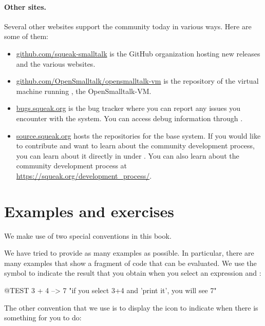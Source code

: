 \documentclass[a4paper,10pt,twoside]{book}
\begin{document}
\paragraph{Other sites.} Several other websites support the \sq community today in various ways.
Here are some of them:
\begin{itemize}
  \item \url{github.com/squeak-smalltalk} is the GitHub organization hosting new releases and the various \sq websites.

  \item \url{github.com/OpenSmalltalk/opensmalltalk-vm} is the repository of the virtual machine running \sq, the Open\-Smalltalk-VM.

  \item \url{bugs.squeak.org} is the bug tracker where you can report any issues you encounter with the system. You can access debug information through .

  \item \url{source.squeak.org} hosts the repositories for the base system. If you would like to contribute and want to learn about the community development process, you can learn about it directly in \Squeak under . You can also learn about the community development process at \url{https://squeak.org/development_process/}.

\end{itemize}

\section*{Examples and exercises}

We make use of two special conventions in this book.

We have tried to provide as many examples as possible.
In particular, there are many examples that show a fragment of code that can be evaluated.
We use the symbol \ct{-->} to indicate the result that you obtain when you select an expression and :

\begin{code}{@TEST}
3 + 4 --> 7    "if you select 3+4 and 'print it', you will see 7"
\end{code}


The other convention that we use is to display the icon \dothisicon{} to indicate when there is something for you to do:


\ifx\wholebook\relax\else
   
   
\end{document}
